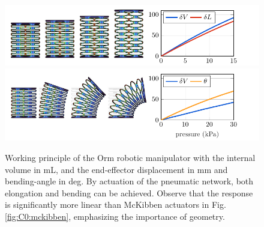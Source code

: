 \begin{figure}[!t]
  \centering
  \vspace{-3mm}
  \includegraphics{./pdf/thesis-figurex-2-4-1.pdf}
  \includegraphics{./pdf/thesis-figurex-2-4-2.pdf}
  \vspace{-7mm}
  \caption{Working principle of the Orm robotic manipulator \cite{BibEntryOrm2019Sep} with the internal volume  in \si{\milli \liter}, and the end-effector displacement  in \si{\milli \meter} and bending-angle  in deg. By actuation of the pneumatic network, both elongation and bending can be achieved. Observe that the response is significantly more linear than McKibben actuators in Fig. \ref{fig:C0:mckibben}, emphasizing the importance of geometry.
  \label{fig:C0:ormrobot}}
\end{figure}

